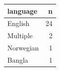 \begin{tabular}{lr}
\toprule
language & n \\
\midrule
English & 24 \\
Multiple & 2 \\
Norwegian & 1 \\
Bangla & 1 \\
\bottomrule
\end{tabular}
